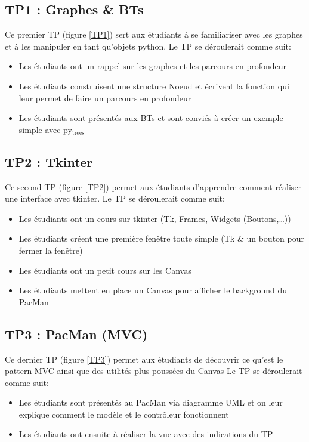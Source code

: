 \documentclass[11pt]{article}
\begin{document}
\subsection{TP1 : Graphes \& BTs}
\label{sec-4-2}
Ce premier TP (figure \ref{TP1}) sert aux étudiants à se familiariser avec les graphes et à les manipuler en tant qu'objets python.
Le TP se déroulerait comme suit:
\begin{itemize}
\item Les étudiants ont un rappel sur les graphes et les parcours en profondeur
\item Les étudiants construisent une structure Noeud et écrivent la fonction qui leur permet de faire un parcours en profondeur
\item Les étudiants sont présentés aux BTs et sont conviés à créer un exemple simple avec py$_{\text{trees}}$
\end{itemize}

\subsection{TP2 : Tkinter}
\label{sec-4-3}
Ce second TP (figure \ref{TP2}) permet aux étudiants d'apprendre comment réaliser une interface avec tkinter.
Le TP se déroulerait comme suit:
\begin{itemize}
\item Les étudiants ont un cours sur tkinter (Tk, Frames, Widgets (Boutons,\ldots{}))
\item Les étudiants créent une première fenêtre toute simple (Tk \& un bouton pour fermer la fenêtre)
\item Les étudiants ont un petit cours sur les Canvas
\item Les étudiants mettent en place un Canvas pour afficher le background du PacMan
\end{itemize}

\subsection{TP3 : PacMan (MVC)}
\label{sec-4-4}
Ce dernier TP (figure \ref{TP3}) permet aux étudiants de découvrir ce qu'est le pattern MVC ainsi que des utilités plus poussées du Canvas
Le TP se déroulerait comme suit:
\begin{itemize}
\item Les étudiants sont présentés au PacMan via diagramme UML et on leur explique comment le modèle et le contrôleur fonctionnent
\item Les étudiants ont ensuite à réaliser la vue avec des indications du TP
\end{itemize}
\end{document}
